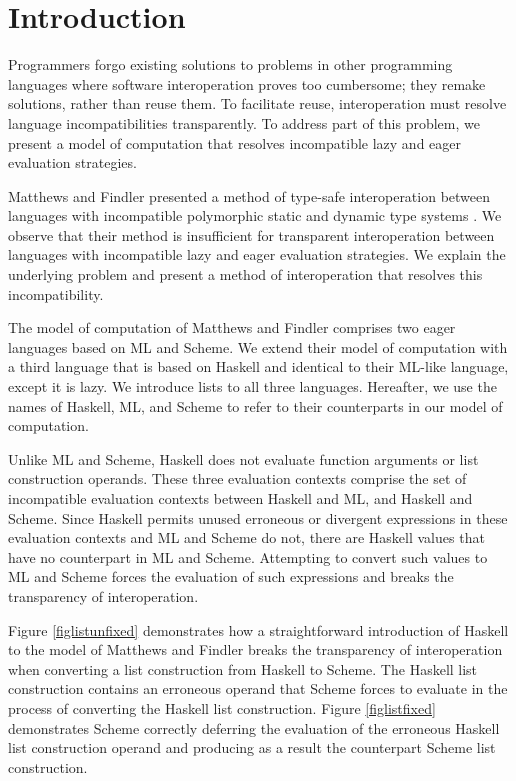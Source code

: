 \chapter{Introduction}

Programmers forgo existing solutions to problems in other programming languages where software interoperation proves too cumbersome; they remake solutions, rather than reuse them. To facilitate reuse, interoperation must resolve language incompatibilities transparently. To address part of this problem, we present a model of computation that resolves incompatible lazy and eager evaluation strategies.

Matthews and Findler presented a method of type-safe interoperation between languages with incompatible polymorphic static and dynamic type systems \cite{matthews07}. We observe that their method is insufficient for transparent interoperation between languages with incompatible lazy and eager evaluation strategies. We explain the underlying problem and present a method of interoperation that resolves this incompatibility.

The model of computation of Matthews and Findler comprises two eager languages based on ML and Scheme. We extend their model of computation with a third language that is based on Haskell and identical to their ML-like language, except it is lazy. We introduce lists to all three languages. Hereafter, we use the names of Haskell, ML, and Scheme to refer to their counterparts in our model of computation.

Unlike ML and Scheme, Haskell does not evaluate function arguments or list construction operands. These three evaluation contexts comprise the set of incompatible evaluation contexts between Haskell and ML, and Haskell and Scheme. Since Haskell permits unused erroneous or divergent expressions in these evaluation contexts and ML and Scheme do not, there are Haskell values that have no counterpart in ML and Scheme. Attempting to convert such values to ML and Scheme forces the evaluation of such expressions and breaks the transparency of interoperation.

Figure \ref{figlistunfixed} demonstrates how a straightforward introduction of Haskell to the model of Matthews and Findler breaks the transparency of interoperation when converting a list construction from Haskell to Scheme. The Haskell list construction contains an erroneous operand that Scheme forces to evaluate in the process of converting the Haskell list construction. Figure \ref{figlistfixed} demonstrates Scheme correctly deferring the evaluation of the erroneous Haskell list construction operand and producing as a result the counterpart Scheme list construction.

